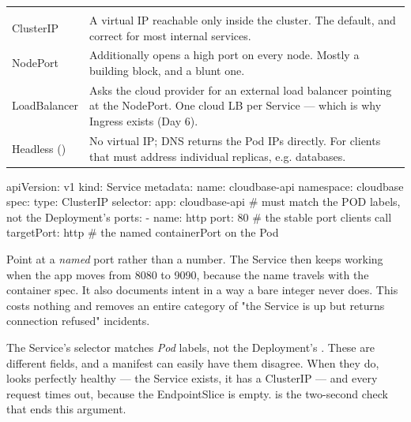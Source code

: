 \begin{center}\small
\wbrowcolors
\begin{tabularx}{\linewidth}{@{}L{28mm} X@{}}
 & \\
ClusterIP & A virtual IP reachable only inside the cluster. The default, and correct for most internal services.\\
NodePort & Additionally opens a high port on every node. Mostly a building block, and a blunt one.\\
LoadBalancer & Asks the cloud provider for an external load balancer pointing at the NodePort. One cloud LB per Service --- which is why Ingress exists (Day 6).\\
Headless () & No virtual IP; DNS returns the Pod IPs directly. For clients that must address individual replicas, e.g. databases.\\
\end{tabularx}
\end{center}

\begin{k8sbox}
apiVersion: v1
kind: Service
metadata:
  name: cloudbase-api
  namespace: cloudbase
spec:
  type: ClusterIP
  selector:
    app: cloudbase-api     # must match the POD labels, not the Deployment's
  ports:
    - name: http
      port: 80             # the stable port clients call
      targetPort: http     # the named containerPort on the Pod
\end{k8sbox}

\begin{seniornote}
Point  at a \emph{named} port rather than a number. The Service then keeps working when the app moves from 8080 to 9090, because the name travels with the container spec. It also documents intent in a way a bare integer never does. This costs nothing and removes an entire category of "the Service is up but returns connection refused" incidents.
\end{seniornote}

\begin{misconception}
The Service's selector matches \emph{Pod} labels, not the Deployment's . These are different fields, and a manifest can easily have them disagree. When they do,  looks perfectly healthy --- the Service exists, it has a ClusterIP --- and every request times out, because the EndpointSlice is empty.  is the two-second check that ends this argument.
\end{misconception}

